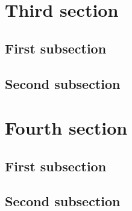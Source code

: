 \documentclass[twoside, 10pt]{book}
\begin{document}
\section{Third section}
\subsection{First subsection}
\lipsum
\subsection{Second subsection}
\lipsum
\section{Fourth section}
\subsection{First subsection}
\lipsum
\subsection{Second subsection}
\lipsum
\end{document}
